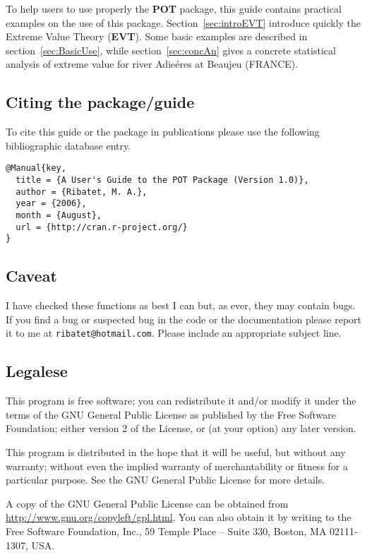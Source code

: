 \documentclass[11pt,a4paper]{article}
\numberwithin{equation}{section}
\begin{document}
To help users to use properly the \textbf{POT} package, this guide
contains practical examples on the use of this
package. Section~\ref{sec:introEVT} introduce quickly the Extreme
Value Theory (\textbf{EVT}). Some basic examples are described in
section~\ref{sec:BasicUse}, while section~\ref{sec:concAn} gives a
concrete statistical analysis of extreme value for river Adie\'eres at
Beaujeu (FRANCE).

\subsection{Citing the package/guide}

To cite this guide or the package in publications please use the
following bibliographic database entry.
\begin{verbatim}
@Manual{key,
  title = {A User's Guide to the POT Package (Version 1.0)},
  author = {Ribatet, M. A.},
  year = {2006},
  month = {August},
  url = {http://cran.r-project.org/}
}
\end{verbatim}

\subsection{Caveat}

I have checked these functions as best I can but, as ever, they may
contain bugs.  If you find a bug or suspected bug in the code or the
documentation please report it to me at \verb+ribatet@hotmail.com+.
Please include an appropriate subject line.

\subsection{Legalese}

This program is free software; you can redistribute it and/or modify
it under the terms of the GNU General Public License as published by
the Free Software Foundation; either version 2 of the License, or (at
your option) any later version.

This program is distributed in the hope that it will be useful, but
without any warranty; without even the implied warranty of
merchantability or fitness for a particular purpose.  See the GNU
General Public License for more details.

A copy of the GNU General Public License can be obtained from
\url{http://www.gnu.org/copyleft/gpl.html}.  You can also obtain it by
writing to the Free Software Foundation, Inc., 59 Temple Place --
Suite 330, Boston, MA 02111-1307, USA.
\end{document}

